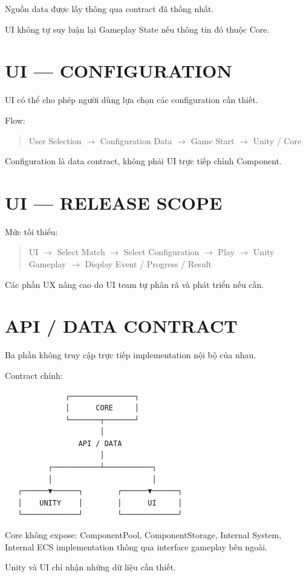 \documentclass[12pt,a4paper]{article}
\newcommand{\flow}[1]{%
  \begin{quote}\centering\ttfamily #1\end{quote}%
}
\begin{document}
Nguồn data được lấy thông qua contract đã thống nhất.

UI không tự suy luận lại Gameplay State nếu thông tin đó thuộc Core.

\section{UI --- CONFIGURATION}

UI có thể cho phép người dùng lựa chọn các configuration cần thiết.

Flow:

\flow{User Selection $\rightarrow$ Configuration Data $\rightarrow$ Game Start $\rightarrow$ Unity / Core}

Configuration là data contract, không phải UI trực tiếp chỉnh Component.

\section{UI --- RELEASE SCOPE}

Mức tối thiểu:

\flow{UI $\rightarrow$ Select Match $\rightarrow$ Select Configuration $\rightarrow$ Play $\rightarrow$ Unity Gameplay $\rightarrow$ Display Event / Progress / Result}

Các phần UX nâng cao do UI team tự phân rã và phát triển nếu cần.

\section{API / DATA CONTRACT}

Ba phần không truy cập trực tiếp implementation nội bộ của nhau.

Contract chính:

\begin{verbatim}
              ┌───────────────┐
              │      CORE     │
              └───────┬───────┘
                      │
                 API / DATA
                      │
          ┌───────────┴───────────┐
          │                       │
   ┌──────▼──────┐        ┌──────▼──────┐
   │    UNITY    │        │      UI     │
   └─────────────┘        └─────────────┘
\end{verbatim}

Core không expose: ComponentPool, ComponentStorage, Internal System, Internal ECS implementation thông qua interface gameplay bên ngoài.

Unity và UI chỉ nhận những dữ liệu cần thiết.
\end{document}
